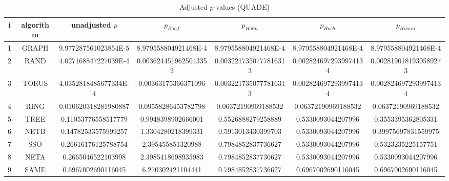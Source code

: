 \documentclass[a4paper,10pt]{article}
\begin{document}
\begin{landscape}
\begin{table}[!htp]
\centering\scriptsize
\caption{Adjusted $p$-values (QUADE)}
\begin{tabular}{ccccccc}
i&algorithm&unadjusted $p$&$p_{Bonf}$&$p_{Holm}$&$p_{Hoch}$&$p_{Homm}$\\
\hline
1& GRAPH&9.977287561023854E-5&8.979558804921468E-4&8.979558804921468E-4&8.979558804921468E-4&8.979558804921468E-4\\
2& RAND&4.027168847227039E-4&0.0036244519625043352&0.0032217350777816313&0.0028246972939974134&0.0028190181930589273\\
3& TORUS&4.0352818485677334E-4&0.00363175366371096&0.0032217350777816313&0.0028246972939974134&0.0028246972939974134\\
4& RING&0.010620318281980887&0.09558286453782798&0.06372190969188532&0.06372190969188532&0.06372190969188532\\
5& TREE&0.11053776558517779&0.9948398902666001&0.5526888279258889&0.5330093044207996&0.3553395362805331\\
6& NETB&0.14782533575999257&1.3304280218399331&0.5913013430399703&0.5330093044207996&0.39975697831559975\\
7& SSO&0.26616176125788754&2.395455851320988&0.7984852837736627&0.5330093044207996&0.5323235225157751\\
8& NETA&0.2665046522103998&2.3985418698935983&0.7984852837736627&0.5330093044207996&0.5330093044207996\\
9& SAME&0.6967002690116045&6.270302421104441&0.7984852837736627&0.6967002690116045&0.6967002690116045\\
\hline
\end{tabular}
\end{table}


\end{landscape}
\end{document}
